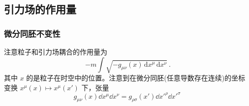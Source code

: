 \subsection{引力场的作用量}

\subsubsection{微分同胚不变性}
注意粒子和引力场耦合的作用量为
\begin{equation}
-m\int\sqrt{-g_{\mu\nu}(x) \,\mathrm{d}{x} ^\mu \,\mathrm{d}{x} ^\nu}~.
\end{equation}
其中 $x$ 的是粒子在时空中的位置。注意到在微分同胚(任意导数存在连续)的坐标变换 $x^\mu(x) \mapsto x^\mu(x')$ 下，张量
\begin{equation}
g_{\mu\nu}(x) \dd x^\mu \dd{x} ^\nu=g_{\rho\sigma}(x') \dd{x'} ^\rho \dd{x'} ^{\sigma}~
\end{equation}


























